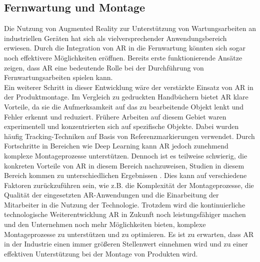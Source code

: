 \subsection{Fernwartung und Montage}
Die Nutzung von Augmented Reality zur Unterstützung von Wartungsarbeiten
an industriellen Geräten hat sich als vielversprechender Anwendungsbereich
erwiesen. Durch die Integration von AR in die Fernwartung könnten sich sogar
noch effektivere Möglichkeiten eröffnen. Bereits erste funktionierende Ansätze
zeigen, dass AR eine bedeutende Rolle bei der Durchführung von
Fernwartungsarbeiten spielen kann. \cite{masoni2017supporting} \\Ein weiterer
Schritt in dieser Entwicklung wäre der verstärkte Einsatz von AR in der
Produktmontage. Im Vergleich zu gedruckten Handbüchern bietet AR klare
Vorteile, da sie die Aufmerksamkeit auf das zu bearbeitende Objekt lenkt und
Fehler erkennt und reduziert. Frühere Arbeiten auf diesem Gebiet waren
experimentell und konzentrierten sich auf spezifische Objekte. Dabei wurden
häufig Tracking-Techniken auf Basis von Referenzmarkierungen verwendet. Durch
Fortschritte in Bereichen wie Deep Learning kann AR jedoch zunehmend komplexe
Montageprozesse unterstützen. Dennoch ist es teilweise schwierig, die konkreten
Vorteile von AR in diesem Bereich nachzuweisen, Studien in diesem Bereich
kommen zu unterschiedlichen Ergebnissen \cite{tang2003comparative}. Dies kann
auf verschiedene Faktoren zurückzuführen sein, wie z.B. die Komplexität der
Montageprozesse, die Qualität der eingesetzten AR-Anwendungen und die
Einarbeitung der Mitarbeiter in die Nutzung der Technologie. Trotzdem wird die
kontinuierliche technologische Weiterentwicklung AR in Zukunft noch
leistungsfähiger machen und den Unternehmen noch mehr Möglichkeiten bieten,
komplexe Montageprozesse zu unterstützen und zu optimieren. Es ist zu erwarten,
dass AR in der Industrie einen immer größeren Stellenwert einnehmen wird und zu
einer effektiven Unterstützung bei der Montage von Produkten
wird.\cite{8951930}

